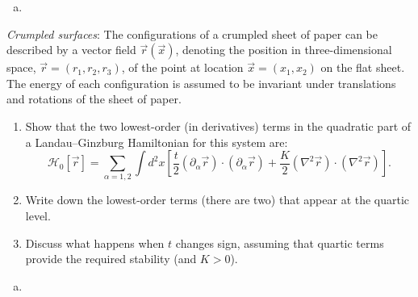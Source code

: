 \begin{solution}
    \begin{enumerate}[(a)]
        \item
    \end{enumerate}
\end{solution}

\begin{problem}
    \textit{Crumpled surfaces}: The configurations of a crumpled sheet of paper can be described by a vector field $\vec{r}(\vec{x})$, denoting the position in three-dimensional space, $\vec{r} = (r_1, r_2, r_3)$, of the point at location $\vec{x} = (x_1, x_2)$ on the flat sheet. The energy of each configuration is assumed to be invariant under translations and rotations of the sheet of paper.

    \begin{enumerate}
        \item[(a)] Show that the two lowest-order (in derivatives) terms in the quadratic part of a Landau--Ginzburg Hamiltonian for this system are:
        \[
            \mathcal{H}_0[\vec{r}] = \sum_{\alpha=1,2}\int d^2x\left[\frac{t}{2}(\partial_\alpha\vec{r})\cdot(\partial_\alpha\vec{r}) + \frac{K}{2}(\nabla^2\vec{r})\cdot(\nabla^2\vec{r})\right].
        \]

        \item[(b)] Write down the lowest-order terms (there are two) that appear at the quartic level.

        \item[(c)] Discuss what happens when $t$ changes sign, assuming that quartic terms provide the required stability (and $K > 0$).
    \end{enumerate}
\end{problem}

\begin{solution}
    \begin{enumerate}[(a)]
        \item
    \end{enumerate}
\end{solution}
